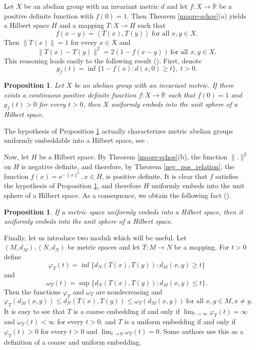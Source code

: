 \documentclass[a4paper,oneside]{amsart}
\newtheorem{pro}[thm]{Proposition}
\theoremstyle{definition}
\begin{document}
Let $X$ be an abelian group with an invariant metric $d$ and let $f:X\to{\mathbb{R}}$ be a positive definite function with $f(0)=1$. Then Theorem \ref{moore-schoe}(a) yields a Hilbert space $H$ and a mapping $T:X\to H$ such that 
$$f(x-y)=\left\langle T(x),T(y)\right\rangle\ \text{for all }x,y\in X.$$
Then $\|T(x)\|=1$ for every $x\in X$ and 
$$\|T(x)-T(y)\|^2=2(1-f(x-y))\ \text{for all }x,y\in X.$$
This reasoning leads easily to the following result (\cite[Proposition 3.2]{amm}). First, denote
\begin{equation}\label{def_g_f}
g_f(t)=\inf\{1-f(x):d(x,0)\geq t\},\ t>0.
\end{equation}

\begin{pro}\label{amm_group_emb_into_sphere}
Let $X$ be an abelian group with an invariant metric. If there exists a continuous positive definite function $f:X\to{\mathbb{R}}$ such that $f(0)=1$ and $g_f(t)>0$ for every $t>0$, then $X$ uniformly embeds into the unit sphere of a Hilbert space. 
\end{pro}

The hypothesis of Proposition \ref{amm_group_emb_into_sphere} actually characterizes metric abelian groups uniformly embeddable into a Hilbert space, see \cite[Theorem~3.1]{amm}.

Now, let $H$ be a Hilbert space. By Theorem \ref{moore-schoe}(b), the function $\|.\|^2$ on $H$ is negative definite, and therefore, by Theorem \ref{neg_pos_relation}, the function $f(x)={\mathrm{e}}^{-\|x\|^2},x\in H$, is positive definite. It is clear that $f$ satisfies the hypothesis of Proposition \ref{amm_group_emb_into_sphere}, and therefore $H$ uniformly embeds into the unit sphere of a Hilbert space. As a consequence, we obtain the following fact (\cite[paragraph after Corollary 3.3]{amm}).

\begin{pro}\label{red_sphere}
If a metric space uniformly embeds into a Hilbert space, then it uniformly embeds into the unit sphere of a Hilbert space.
\end{pro}

Finally, let us introduce two moduli which will be useful. Let $(M,d_M),(N,d_N)$ be metric spaces and let $T:M\to N$ be a mapping. For $t>0$ define
\begin{equation}\label{low_mod}
\varphi_T(t)=\inf\{d_N(T(x),T(y)):d_M(x,y)\geq t\}
\end{equation}
and
\begin{equation}\label{up_mod}
\omega_T(t)=\sup\{d_N(T(x),T(y)):d_M(x,y)\leq t\}.
\end{equation}
Then the functions $\varphi_T$ and $\omega_T$ are nondecreasing and
$$\varphi_T(d_M(x,y))\leq d_N(T(x),T(y))\leq\omega_T(d_M(x,y))\ \text{for all }x,y\in M,x\neq y.$$
It is easy to see that $T$ is a coarse embedding if and only if $\lim_{t\to\infty}\varphi_T(t)=\infty$ and $\omega_T(t)<\infty$ for every $t>0$, and $T$ is a uniform embedding if and only if $\varphi_T(t)>0$ for every $t>0$ and $\lim_{t\to0}\omega_T(t)=0$. Some authors use this as a definition of a coarse and uniform embedding.
\end{document}
